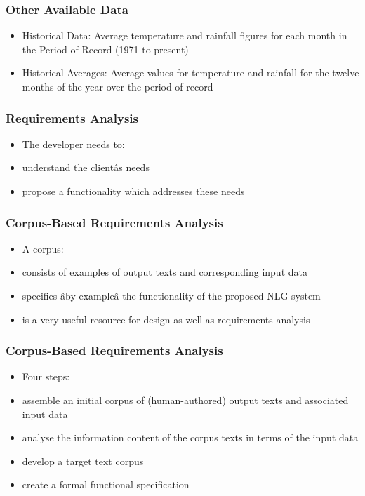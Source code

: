 \documentclass[compress,color=usenames]{beamer}
\begin{document}
\begin{frame}
\frametitle{Other Available Data}

\label{f74}
\begin{itemize}
\item { {Historical Data: Average temperature and rainfall figures for each month in the Period of Record (1971 to present)}}
\item { {Historical Averages: Average values for temperature and rainfall for the twelve months of the year over the period of record}}
\end{itemize}

\end{frame}

\begin{frame}
\frametitle{Requirements Analysis}

\label{f76}
\begin{itemize}
\item { {The developer needs to:}}
\item { {understand the client\^as needs}}
\item { {propose a functionality which addresses these needs}}
\end{itemize}

\end{frame}

\begin{frame}
\frametitle{Corpus-Based Requirements Analysis}

\label{f78}
\begin{itemize}
\item { {A corpus:}}
\item { {consists of examples of output texts and corresponding input data}}
\item { {specifies \^aby example\^a the functionality of the proposed NLG system}}
\item { {is a very useful resource for design as well as requirements analysis}}
\end{itemize}

\end{frame}

\begin{frame}
\frametitle{Corpus-Based Requirements Analysis}

\label{f80}
\begin{itemize}
\item { {Four steps:}}
\item { {assemble an initial corpus of (human-authored) output texts and associated input data}}
\item { {analyse the information content of the corpus texts in terms of the input data}}
\item { {develop a target text corpus}}
\item { {create a formal functional specification}}
\end{itemize}

\end{frame}
\end{document}

